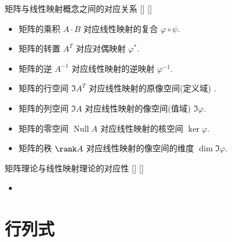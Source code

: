 \documentclass[UTF8]{ctexart}
\DeclareMathOperator{\0}{\mathbf{0}}
\DeclareMathOperator{\Null}{Null}
\DeclareMathOperator{\<}{\langle}
\renewcommand{\>}{\rangle}
\begin{document}
		\begin{xmp}
			[]
			{矩阵与线性映射概念之间的对应关系}
			[]
			[]
			\begin{itemize}
				\item 矩阵的乘积 \(A\cdot B\) 对应线性映射的复合 \(\varphi\circ\psi\).
				\item 矩阵的转置 \(A^T\) 对应对偶映射 \(\varphi^*\).
				\item 矩阵的逆 \(A^{-1}\) 对应线性映射的逆映射 \(\varphi^{-1}\).
				\item 矩阵的行空间 \(\Im A^T\) 对应线性映射的原像空间(定义域) . 
				\item 矩阵的列空间 \(\Im A\) 对应线性映射的像空间(值域)  \(\Im\varphi\).
				\item 矩阵的零空间 \(\Null A\) 对应线性映射的核空间 \(\ker \varphi\).
				\item 矩阵的秩 \(\rank A\) 对应线性映射的像空间的维度 \(\dim\Im\varphi\).
			\end{itemize}
		\end{xmp}

		\begin{xmp}
			[]
			{矩阵理论与线性映射理论的对应性}
			[]
			[]
			\begin{itemize}
				\item 
			\end{itemize}
		\end{xmp}
	
\section{行列式}
	
\end{document}
